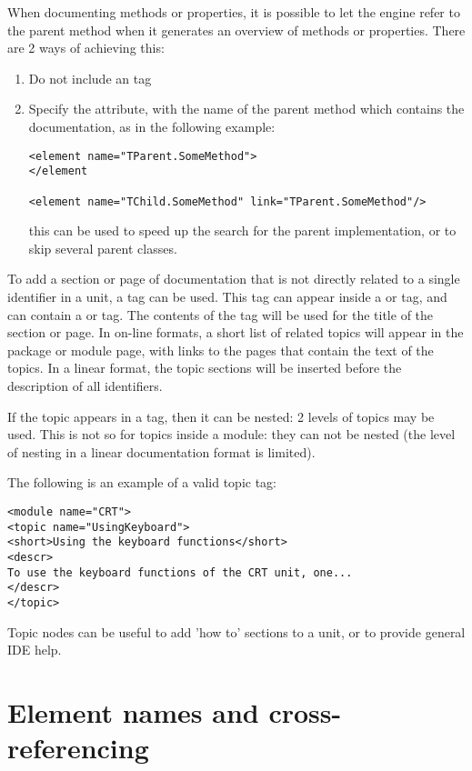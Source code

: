 When documenting methods or properties, it is possible to let the  engine
refer to the parent method when it generates an overview of methods or
properties. There are 2 ways of achieving this: 
\begin{enumerate}
\item Do not include an  tag
\item Specify the  attribute, with the name of the parent
method which contains the documentation, as in the following example:
\begin{verbatim}
<element name="TParent.SomeMethod">
</element

<element name="TChild.SomeMethod" link="TParent.SomeMethod"/>
\end{verbatim}
this can be used to speed up the search for the parent implementation,
or to skip several parent classes.
\end{enumerate}

To add a section or page of documentation that is not directly related to a
single identifier in a unit, a  tag can be used. This tag can
appear inside a  or  tag, and can contain a
 or  tag. The contents of the  tag will be
used for the title of the section or page. In on-line formats, a short list
of related topics will appear in the package or module page, with links to
the pages that contain the text of the topics. In a linear format, the topic
sections will be inserted before the description of all identifiers.

If the topic appears in a  tag, then it can be nested: 2 levels
of topics may be used. This is not so for topics inside a module: they can
not be nested (the level of nesting in a linear documentation format is limited).

The following is an example of a valid topic tag:
\begin{verbatim}
<module name="CRT">
<topic name="UsingKeyboard">
<short>Using the keyboard functions</short>
<descr>
To use the keyboard functions of the CRT unit, one...
</descr>
</topic>
\end{verbatim}

Topic nodes can be useful to add 'how to' sections to a unit, or to provide
general IDE help.

\section{Element names and cross-referencing}

